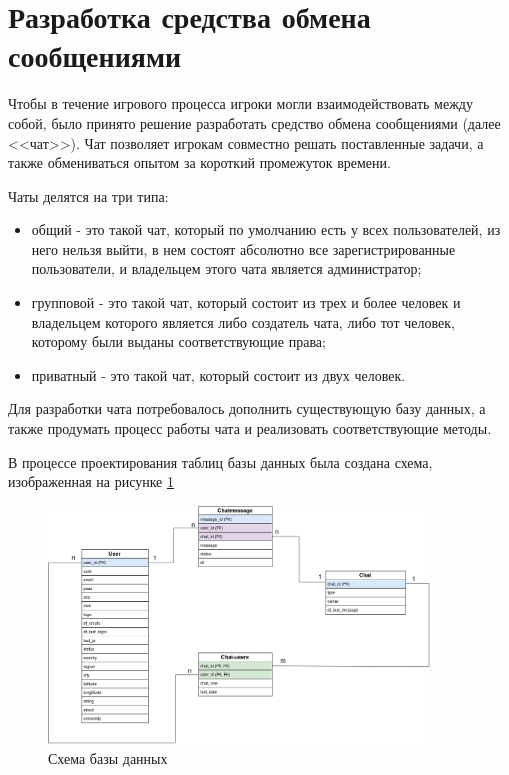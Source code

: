 \section{Разработка средства обмена сообщениями}
Чтобы в течение игрового процесса игроки могли взаимодействовать между собой, было
принято решение разработать средство обмена сообщениями (далее <<чат>>). Чат позволяет
игрокам совместно решать поставленные задачи, а также обмениваться опытом за короткий промежуток времени. \par 

Чаты делятся на три типа:
\begin{itemize}
    \item общий - это такой чат, который по умолчанию есть у всех пользователей, из него нельзя выйти, в нем состоят абсолютно все зарегистрированные пользователи, и владельцем этого чата является администратор;
    \item групповой - это такой чат, который состоит из трех и более человек и владельцем которого является либо создатель чата, либо тот человек, которому были выданы соответствующие права;
    \item приватный - это такой чат, который состоит из двух человек.
\end{itemize}

\vspace{1em}

Для разработки чата потребовалось дополнить существующую базу данных, а также продумать процесс 
работы чата и реализовать соответствующие методы. \par 

В процессе проектирования таблиц базы данных была создана схема, изображенная на рисунке \ref{img:bd_schema}

\clearpage

\begin{figure}[h!]
    \centering
    \includegraphics[width=0.9\textwidth]{images/database}
    \caption{Схема базы данных}
    \label{img:bd_schema}
\end{figure}

